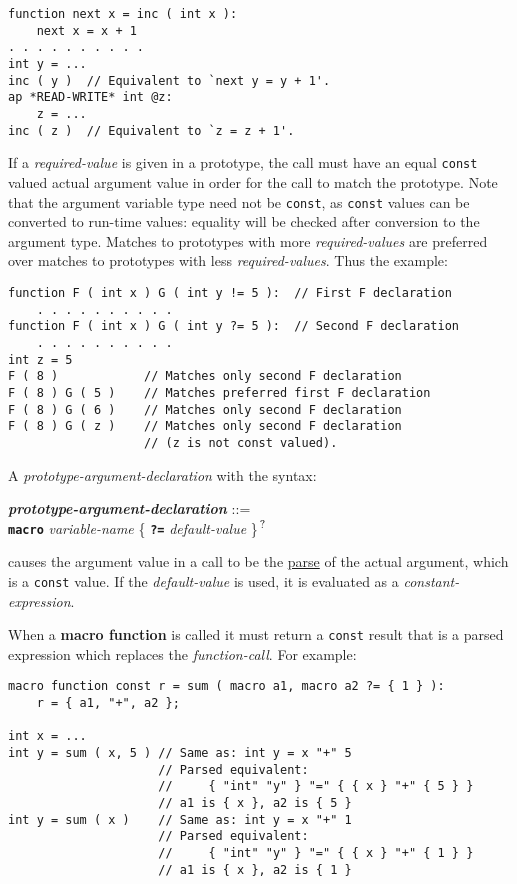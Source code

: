 \documentclass[12pt]{article}
\newcommand{\TT}[1]{{\tt \bfseries #1}}
\newcommand{\QMARK}{{$^{\,\mbox{\footnotesize ?}}$}}
\newcommand{\key}[1]{{\rm \bfseries #1}}
\newcommand{\emkey}[1]{{\em \bfseries #1}}
\newenvironment{indpar}[1][0.3in]%
	{\begin{list}{}%
		     {\setlength{\itemsep}{0in}%
		      \setlength{\topsep}{0in}%
		      \setlength{\parsep}{1ex}%
		      \setlength{\labelwidth}{#1}%
		      \setlength{\leftmargin}{#1}%
		      \addtolength{\leftmargin}{\labelsep}}%
	 \item}%
	{\end{list}}
\begin{document}
\begin{indpar}\begin{verbatim}
function next x = inc ( int x ):
    next x = x + 1
. . . . . . . . . .
int y = ...
inc ( y )  // Equivalent to `next y = y + 1'.
ap *READ-WRITE* int @z:
    z = ...
inc ( z )  // Equivalent to `z = z + 1'.
\end{verbatim}\end{indpar}

If a {\em required-value} is given in a prototype, the call must
have an equal {\tt const} valued actual argument value
in order for the call to match the prototype.
Note that the argument variable type need not be {\tt const},
as {\tt const} values can be converted to run-time values:
equality will be checked after conversion to the argument type.
Matches to prototypes with more {\em required-values}
are preferred over matches to prototypes with less {\em required-values}.
Thus the example:
\begin{indpar}\begin{verbatim}
function F ( int x ) G ( int y != 5 ):  // First F declaration
    . . . . . . . . . .
function F ( int x ) G ( int y ?= 5 ):  // Second F declaration
    . . . . . . . . . .
int z = 5
F ( 8 )            // Matches only second F declaration
F ( 8 ) G ( 5 )    // Matches preferred first F declaration
F ( 8 ) G ( 6 )    // Matches only second F declaration
F ( 8 ) G ( z )    // Matches only second F declaration
                   // (z is not const valued).
\end{verbatim}\end{indpar}

A {\em prototype-argument-declaration} with the syntax:
\begin{indpar}
\emkey{prototype-argument-declaration}\label{MACRO-ARGUMENT-DECLARATION} ::= \\
\hspace*{1in} \TT{macro} {\em variable-name}
                         \{ \TT{?=} {\em default-value} \}\QMARK{}
\end{indpar}
causes the argument value in a call to be the \underline{parse}
of the actual argument, which is a {\tt const} value.  If the
{\em default-value} is used, it is evaluated as a {\em constant-expression}.

When a \key{macro function} is called it must return a {\tt const} result
that is a parsed expression which replaces
the {\em function-call}.  For example:
\begin{indpar}\begin{verbatim}
macro function const r = sum ( macro a1, macro a2 ?= { 1 } ):
    r = { a1, "+", a2 };
    
int x = ...
int y = sum ( x, 5 ) // Same as: int y = x "+" 5
                     // Parsed equivalent:
                     //     { "int" "y" } "=" { { x } "+" { 5 } }
                     // a1 is { x }, a2 is { 5 }
int y = sum ( x )    // Same as: int y = x "+" 1
                     // Parsed equivalent:
                     //     { "int" "y" } "=" { { x } "+" { 1 } }
                     // a1 is { x }, a2 is { 1 }
\end{verbatim}\end{indpar}
\end{document}
